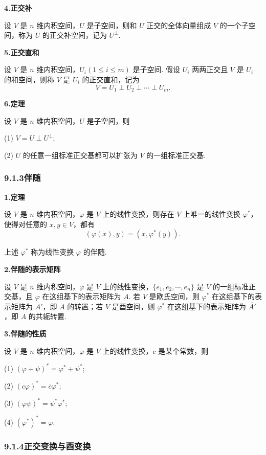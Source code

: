\documentclass[UTF8, 12pt, fontset=fandol, oneside]{ctexart}
\begin{document}
\noindent\textbf{4.\quad 正交补}

设 $V$ 是 $n$ 维内积空间，$U$ 是子空间，则和 $U$ 正交的全体向量组成 $V$ 的一个子空间，称为 $U$ 的正交补空间，记为 $U^\perp$.

\noindent\textbf{5.\quad 正交直和}

设 $V$ 是 $n$ 维内积空间，$U_i(1\le i\le m)$ 是子空间. 假设 $U_i$ 两两正交且 $V$ 是 $U_i$ 的和空间，则称 $V$ 是 $U_i$ 的正交直和，记为
\[
V=U_1\perp U_2\perp\cdots\perp U_m.
\]

\noindent\textbf{6.\quad 定理}

设 $V$ 是 $n$ 维内积空间，$U$ 是子空间，则

(1) $V=U\perp U^\perp$;

(2) $U$ 的任意一组标准正交基都可以扩张为 $V$ 的一组标准正交基.

\subsubsection*{9.1.3\quad 伴随}

\noindent\textbf{1.\quad 定理}

设 $V$ 是 $n$ 维内积空间，$\varphi$ 是 $V$ 上的线性变换，则存在 $V$ 上唯一的线性变换 $\varphi^*$，使得对任意的 $x,y\in V$，都有
\[
(\varphi(x),y)=(x,\varphi^*(y)).
\]

上述 $\varphi^*$ 称为线性变换 $\varphi$ 的伴随.

\noindent\textbf{2.\quad 伴随的表示矩阵}

设 $V$ 是 $n$ 维内积空间，$\varphi$ 是 $V$ 上的线性变换，$\{e_1,e_2,\cdots,e_n\}$ 是 $V$ 的一组标准正交基，且 $\varphi$ 在这组基下的表示矩阵为 $A$. 若 $V$ 是欧氏空间，则 $\varphi^*$ 在这组基下的表示矩阵为 $A'$，即 $A$ 的转置；若 $V$ 是酉空间，则 $\varphi^*$ 在这组基下的表示矩阵为 $\overline{A'}$，即 $A$ 的共轭转置.

\noindent\textbf{3.\quad 伴随的性质}

设 $V$ 是 $n$ 维内积空间，$\varphi$ 是 $V$ 上的线性变换，$c$ 是某个常数，则

(1) $(\varphi+\psi)^*=\varphi^*+\psi^*$;

(2) $(c\varphi)^*=\overline{c}\varphi^*$;

(3) $(\varphi\psi)^*=\psi^*\varphi^*$;

(4) $(\varphi^*)^*=\varphi$.

\subsubsection*{9.1.4\quad 正交变换与酉变换}
\end{document}
